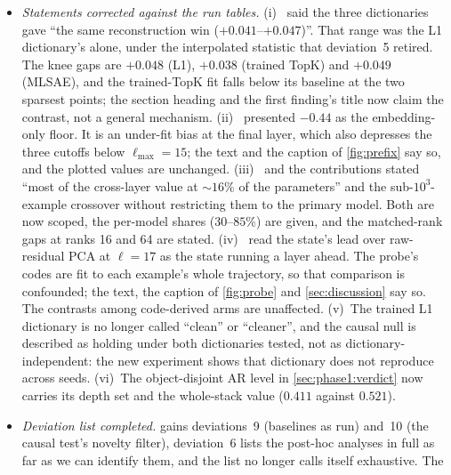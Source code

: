 \begin{itemize}
    \citep{paulo2026seeds,song2026consistency}, depth as a dynamical system
    \citep{fernando2025transformer,fernando2026dynamics}, and random-baseline
    sanity checks for SAEs \citep{korznikov2026sanity}.
  \item \emph{Statements corrected against the run tables.}
    (i)~ said the three dictionaries gave
    ``the same reconstruction win ($+0.041$--$+0.047$)''. That range was the
    L1 dictionary's alone, under the interpolated statistic that deviation~5
    retired. The knee gaps are $+0.048$ (L1), $+0.038$ (trained TopK) and
    $+0.049$ (MLSAE), and the trained-TopK fit falls below its baseline at
    the two sparsest points; the section heading and the first finding's
    title now claim the contrast, not a general mechanism.
    (ii)~ presented $-0.44$ as the
    embedding-only floor. It is an under-fit bias at the final layer, which
    also depresses the three cutoffs below $\ell_{\max}{=}15$; the text and
    the caption of \cref{fig:prefix} say so, and the plotted values are
    unchanged.
    (iii)~ and the contributions
    stated ``most of the cross-layer value at ${\sim}16\%$ of the
    parameters'' and the sub-$10^3$-example crossover without restricting
    them to the primary model. Both are now scoped, the per-model shares
    ($30$--$85\%$) are given, and the matched-rank gaps at ranks 16 and 64
    are stated.
    (iv)~ read the state's lead over raw-residual
    PCA at $\ell{=}17$ as the state running a layer ahead. The probe's codes
    are fit to each example's whole trajectory, so that comparison is
    confounded; the text, the caption of \cref{fig:probe} and
    \cref{sec:discussion} say so. The contrasts among code-derived arms are
    unaffected.
    (v)~The trained L1 dictionary is no longer called ``clean'' or
    ``cleaner'', and the causal null is described as holding under both
    dictionaries tested, not as dictionary-independent: the new experiment
    shows that dictionary does not reproduce across seeds.
    (vi)~The object-disjoint AR level in \cref{sec:phase1:verdict} now
    carries its depth set and the whole-stack value ($0.411$ against
    $0.521$).
  \item \emph{Deviation list completed.}  gains
    deviations~9 (baselines as run) and~10 (the causal test's novelty
    filter), deviation~6 lists the post-hoc analyses in full as far as we
    can identify them, and the list no longer calls itself exhaustive. The

\end{itemize}
